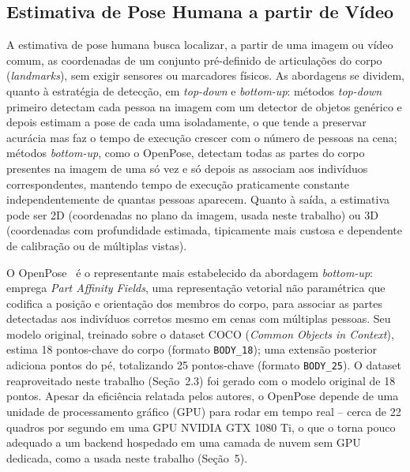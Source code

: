 \documentclass[12pt]{article}
\begin{document}
\subsection{Estimativa de Pose Humana a partir de Vídeo}

A estimativa de pose humana busca localizar, a partir de uma imagem ou
vídeo comum, as coordenadas de um conjunto pré-definido de articulações do
corpo (\textit{landmarks}), sem exigir sensores ou marcadores físicos. As
abordagens se dividem, quanto à estratégia de detecção, em \textit{top-down}
e \textit{bottom-up}: métodos \textit{top-down} primeiro detectam cada
pessoa na imagem com um detector de objetos genérico e depois estimam a pose
de cada uma isoladamente, o que tende a preservar acurácia mas faz o tempo
de execução crescer com o número de pessoas na cena; métodos
\textit{bottom-up}, como o OpenPose, detectam todas as partes do corpo
presentes na imagem de uma só vez e só depois as associam aos indivíduos
correspondentes, mantendo tempo de execução praticamente constante
independentemente de quantas pessoas aparecem. Quanto à saída, a estimativa
pode ser 2D (coordenadas no plano da imagem, usada neste trabalho) ou 3D
(coordenadas com profundidade estimada, tipicamente mais custosa e
dependente de calibração ou de múltiplas vistas).

O OpenPose~\cite{cao2021openpose} é o representante mais estabelecido da
abordagem \textit{bottom-up}: emprega \textit{Part Affinity Fields}, uma
representação vetorial não paramétrica que codifica a posição e orientação
dos membros do corpo, para associar as partes detectadas aos indivíduos
corretos mesmo em cenas com múltiplas pessoas. Seu modelo original, treinado
sobre o dataset COCO (\textit{Common Objects in Context}), estima 18
pontos-chave do corpo (formato
\texttt{BODY\_18}); uma extensão posterior adiciona pontos do pé,
totalizando 25 pontos-chave (formato \texttt{BODY\_25}). O dataset
reaproveitado neste trabalho (Seção~2.3) foi gerado com o modelo original de
18 pontos. Apesar da eficiência relatada pelos autores, o OpenPose depende
de uma unidade de processamento gráfico (GPU) para rodar em tempo real -- cerca de 22 quadros por segundo em uma
GPU NVIDIA GTX 1080 Ti, o que o torna pouco adequado a um backend
hospedado em uma camada de nuvem sem GPU dedicada, como a usada neste
trabalho (Seção~5).
\end{document}
